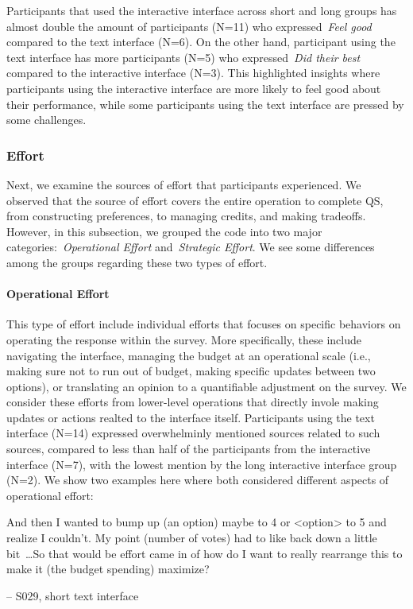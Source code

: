 Participants that used the interactive interface across short and long groups has almost double the amount of participants (N=11) who expressed~\textit{Feel good} compared to the text interface (N=6). On the other hand, participant using the text interface has more participants (N=5) who expressed~\textit{Did their best} compared to the interactive interface (N=3). This highlighted insights where participants using the interactive interface are more likely to feel good about their performance, while some participants using the text interface are pressed by some challenges.


\subsubsection{Effort}
Next, we examine the sources of effort that participants experienced. We observed that the source of effort covers the entire operation to complete QS, from constructing preferences, to managing credits, and making tradeoffs. However, in this subsection, we grouped the code into two major categories:~\textit{Operational Effort} and~\textit{Strategic Effort}. We see some differences among the groups regarding these two types of effort.

\paragraph{Operational Effort} This type of effort include individual efforts that focuses on specific behaviors on operating the response within the survey. More specifically, these include navigating the interface, managing the budget at an operational scale (i.e., making sure not to run out of budget, making specific updates between two options), or translating an opinion to a quantifiable adjustment on the survey. We consider these efforts from lower-level operations that directly invole making updates or actions realted to the interface itself. Participants using the text interface (N=14) expressed overwhelminly mentioned sources related to such sources, compared to less than half of the participants from the interactive interface (N=7), with the lowest mention by the long interactive interface group (N=2). We show two examples here where both considered different aspects of operational effort:

\begin{displayquote}
And then I wanted to bump up (an option) maybe to 4 or <option> to 5 and realize I couldn't. My point (number of votes) had to like back down a little bit~\ldots So that would be effort came in of how do I want to really rearrange this to make it (the budget spending) maximize?

\noindent \hfill -- S029, short text interface
\end{displayquote}

